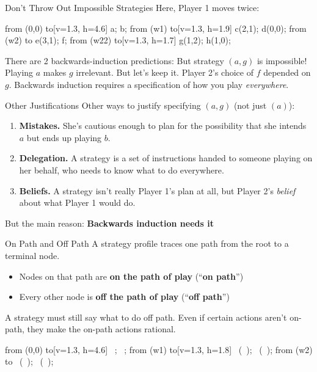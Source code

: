 \begin{frame}{Don't Throw Out Impossible Strategies}
Here, Player 1 moves twice:
\centering
\begin{gametree}[labels=short, scale=0.9]
  \branch[player=1, root=w, label=90] from (0,0) to[v=1.3, h=4.6] {a; b};
  \branch[player=2, label=135] from (w1) to[v=1.3, h=1.9] {c(2,1); d(0,0)};
  \branch[label=45] from (w2) to {e(3,1); f};
  \branch[player=1, label=45] from (w22) to[v=1.3, h=1.7] {g(1,2); h(1,0)};
\end{gametree}
\bsk
\raggedright
There are 2 backwards-induction predictions:
\bsk
But strategy $(a,g)$ is impossible! Playing $a$ makes $g$ irrelevant.
\bsk
But let's keep it. Player 2's choice of $f$ depended on $g$. Backwards induction requires a specification of how you play \textit{everywhere}.
\vspace{-0.2in}
\end{frame}

\begin{frame}{Other Justifications}
Other ways to justify specifying $(a,g)$ (not just $(a)$):
\bsk
\begin{enumerate}
    \item \textbf{Mistakes.} She's cautious enough to plan for the possibility that she
      intends $a$ but ends up playing $b$. \vspace{0.25in}
    \item \textbf{Delegation.} A strategy is a set of instructions handed to someone
      playing on her behalf, who needs to know what to do everywhere. \vspace{0.25in}
    \item \textbf{Beliefs.} A strategy isn't really Player 1's plan at all, but Player 2's
      \textit{belief} about what Player 1 would do. \vspace{0.25in}
\end{enumerate}
\vfill
But the main reason: \textbf{Backwards induction needs it}
\vspace{-0.3in}
\end{frame}

\begin{frame}{On Path and Off Path}
A strategy profile traces one path from the root to a terminal node.
\bsk
\begin{itemize}
    \item Nodes on that path are \textbf{on the path of play} (``\textbf{on path}'')
    \item Every other node is \textbf{off the path of play} (``\textbf{off path}'')
\end{itemize}
\bsk
A strategy must still say what to do off path. Even if certain actions aren't on-path, they make the on-path actions rational.
\vfill
\centering
\begin{gametree}[labels=short, scale=0.72]
  \branch[player=1, root=w, label=90] from (0,0) to[v=1.3, h=4.6] {\ ; \ };
  \branch[player=2, label=135] from (w1) to[v=1.3, h=1.8] {\ (\ ); \ (\ )};
  \branch[label=45] from (w2) to {\ (\ ); \ (\ )};
\end{gametree}
\vspace{-0.15in}
\end{frame}


